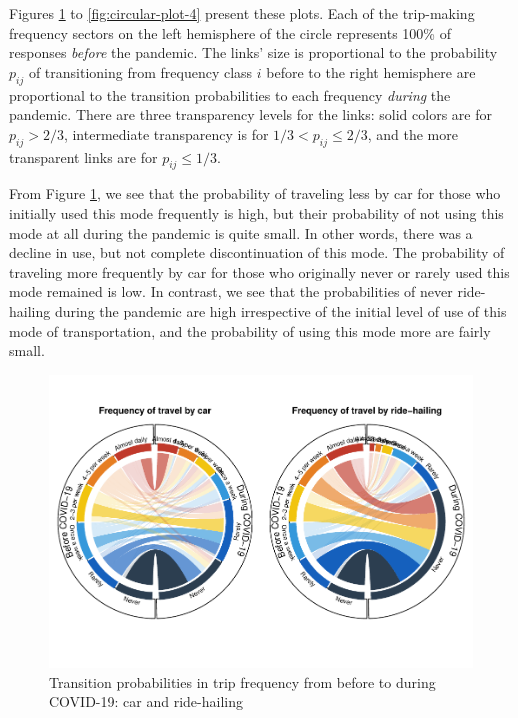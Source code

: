 \documentclass[]{elsarticle} %
\begin{document}
Figures \ref{fig:circular-plot-1} to \ref{fig:circular-plot-4} present
these plots. Each of the trip-making frequency sectors on the left
hemisphere of the circle represents 100\% of responses \emph{before} the
pandemic. The links' size is proportional to the probability \(p_{ij}\)
of transitioning from frequency class \(i\) before to the right
hemisphere are proportional to the transition probabilities to each
frequency \emph{during} the pandemic. There are three transparency
levels for the links: solid colors are for \(p_{ij}>2/3\), intermediate
transparency is for \(1/3 < p_{ij} \le 2/3\), and the more transparent
links are for \(p_{ij}\le 1/3\).

From Figure \ref{fig:circular-plot-1}, we see that the probability of
traveling less by car for those who initially used this mode frequently
is high, but their probability of not using this mode at all during the
pandemic is quite small. In other words, there was a decline in use, but
not complete discontinuation of this mode. The probability of traveling
more frequently by car for those who originally never or rarely used
this mode remained is low. In contrast, we see that the probabilities of
never ride-hailing during the pandemic are high irrespective of the
initial level of use of this mode of transportation, and the probability
of using this mode more are fairly small.

\begin{figure}
\centering
\includegraphics{Frequency-of-Travel-by-Mode-COVID-19-Bangladesh_files/figure-latex/circular-plots-transition-probabilities-1-1.pdf}
\caption{\label{fig:circular-plot-1}Transition probabilities in trip
frequency from before to during COVID-19: car and ride-hailing}
\end{figure}
\end{document}
